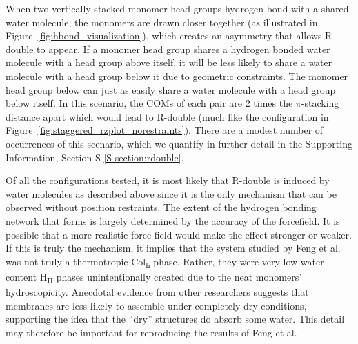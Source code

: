 \documentclass[journal=jpcbfk,manuscript=article]{achemso}
\begin{document}
  When two vertically stacked monomer head groups hydrogen bond with a shared
  water molecule, the monomers are drawn closer together (as illustrated in
  Figure~\ref{fig:hbond_visualization}), which creates an asymmetry that allows
  R-double to appear. If a monomer head group shares a hydrogen bonded water
  molecule with a head group above itself, it will be less likely to share a
  water molecule with a head group below it due to geometric constraints. The
  monomer head group below can just as easily share a water molecule with a head
  group below itself. In this scenario, the COMs of each pair are 2 times the
  $\pi$-stacking distance apart which would lead to R-double (much like the
  configuration in Figure~\ref{fig:staggered_rzplot_norestraints}). There are a
  modest number of occurrences of this scenario, which we quantify in further
  detail in the Supporting Information, Section S-\ref{S-section:rdouble}.  

  
  Of all the configurations tested, it is most likely that R-double is induced
  by water molecules as described above since it is the only mechanism that can
  be observed without position restraints. The extent of the hydrogen bonding
  network that forms is largely determined by the accuracy of the forcefield. It
  is possible that a more realistic force field would make the effect stronger or
  weaker. If this is truly the mechanism, it implies that the system studied by
  Feng et al.\cite{feng_scalable_2014,feng_thin_2016} was not truly a
  thermotropic Col\textsubscript{h} phase. Rather, they were very low water
  content H\textsubscript{II} phases unintentionally created due to the neat
  monomers' hydroscopicity.  Anecdotal evidence from other researchers suggests
  that membranes are less likely to assemble under completely dry
  conditions, supporting the idea %
  that the ``dry'' structures do absorb some water. This detail may therefore be
  important for reproducing the results of Feng et al.
\end{document}
